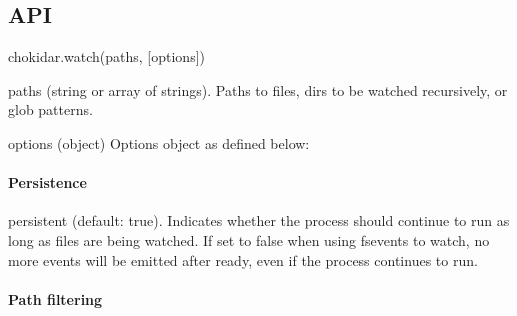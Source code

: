 \subsection*{A\+PI}

{\ttfamily chokidar.\+watch(paths, \mbox{[}options\mbox{]})}


\begin{DoxyItemize}
\item {\ttfamily paths} (string or array of strings). Paths to files, dirs to be watched recursively, or glob patterns.
\item {\ttfamily options} (object) Options object as defined below\+:
\end{DoxyItemize}

\paragraph*{Persistence}


\begin{DoxyItemize}
\item {\ttfamily persistent} (default\+: {\ttfamily true}). Indicates whether the process should continue to run as long as files are being watched. If set to {\ttfamily false} when using {\ttfamily fsevents} to watch, no more events will be emitted after {\ttfamily ready}, even if the process continues to run.
\end{DoxyItemize}

\paragraph*{Path filtering}


